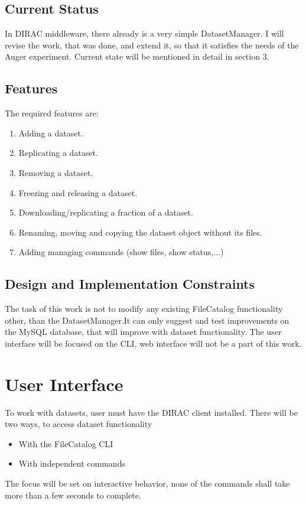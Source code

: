 \documentclass{scrreprt}
\begin{document}
\section{Current Status}

In DIRAC middleware, there already is a very simple DatasetManager. I will revise the work, that was done, and extend it, so that it satisfies the needs of the Auger experiment. Current state will be mentioned in detail in section 3. 


\section{Features}

The required features are:

\begin{enumerate}
\item Adding a dataset.
\item Replicating a dataset.
\item Removing a dataset.
\item Freezing and releasing a dataset.
\item Downloading/replicating a fraction of a dataset.
\item Renaming, moving and copying the dataset object without its files.
\item Adding managing commands (show files, show status,...)
\end{enumerate}


\section{Design and Implementation Constraints}
The task of this work is not to modify any existing FileCatalog functionality other, than the DatasetManager.It can only suggest and test improvements on the MySQL database, that will improve with dataset functionality. The user interface will be focused on the CLI, web interface will not be a part of this work.


\chapter{User Interface}
To work with datasets, user must have the DIRAC client installed. There will be two ways, to access dataset functionality
\begin{itemize}
\item With the FileCatalog CLI
\item With independent commands
\end{itemize}
The focus will be set on interactive behavior, none of the commands shall take more than a few seconds to complete. 
\end{document}

